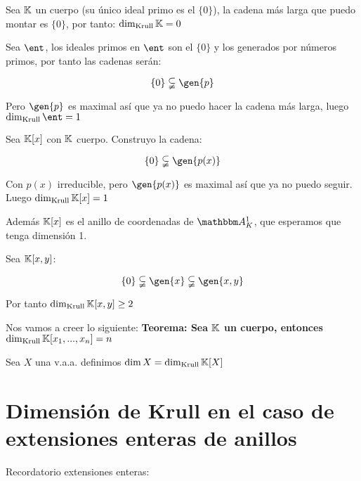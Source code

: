 \begin{example}
	Sea $\mathbb{K}$ un cuerpo (su único ideal primo es el $\{0\}$), la cadena más larga que puedo montar es $\{0\}$, por tanto: $\dim_{\mathrm{Krull}} \mathbb{K} = 0$
\end{example}

\begin{example}
	Sea $\ent$, los ideales primos en $\ent$ son el $\{0\}$ y los generados por números primos, por tanto las cadenas serán:

	$$ \{0\} \subsetneqq \gen{p} $$

	Pero $\gen{p}$ es maximal así que ya no puedo hacer la cadena más larga, luego $\dk \ent = 1$
\end{example}

\begin{example}
	Sea $\mathbb{K}[x]$ con $\mathbb{K}$ cuerpo. Construyo la cadena:

	$$\{0\} \subsetneqq  \gen{p(x)} $$

	Con $p(x)$ irreducible, pero $\gen{p(x)}$ es maximal así que ya no puedo seguir. Luego  $\dim_{\mathrm{Krull}} \mathbb{K}[x] = 1$

	Además $\mathbb{K}[x]$ es el anillo de coordenadas de $\A^1_K$, que esperamos que tenga dimensión 1.
\end{example}

\begin{example}
	Sea $\mathbb{K}[x,y]$:

	$$\{0\} \subsetneqq  \gen{x} \subsetneqq \gen{x,y} $$

	Por tanto  $\dim_{\mathrm{Krull}} \mathbb{K}[x,y] \geq 2$
\end{example}

	Nos vamos a creer lo siguiente: \textbf{Teorema: Sea $\mathbb{K}$ un cuerpo, entonces $\dim_{\mathrm{Krull}} \mathbb{K}[x_1,...,x_n]=n$}

	\begin{defn}
		Sea $X$ una v.a.a. definimos $\dim X = \dim_{\mathrm{Krull}} \mathbb{K}[X]$
	\end{defn}

\section{Dimensión de Krull en el caso de extensiones enteras de anillos}

Recordatorio extensiones enteras:

